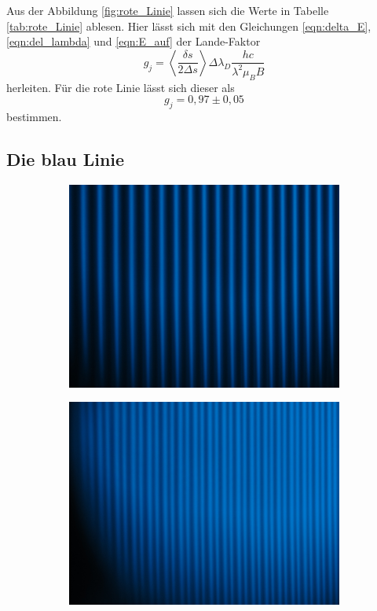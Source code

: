Aus der Abbildung \ref{fig:rote_Linie} lassen sich die Werte in Tabelle \ref{tab:rote_Linie} ablesen.
Hier lässt sich mit den Gleichungen \eqref{eqn:delta_E}, \eqref{eqn:del_lambda} und \eqref{eqn:E_auf} der Lande-Faktor
\begin{equation}
  g_j = \left<\frac{\delta s}{2\Delta s}\right>\Delta \lambda_D \frac{h c}{\lambda^2\mu_B B}
\end{equation}
herleiten.
Für die rote Linie lässt sich dieser als
\begin{equation}
  g_j = 0,97\pm 0,05
\end{equation}
bestimmen.

\subsection{Die blau Linie}
\begin{figure}
  \centering
  \begin{subfigure}{0.4\textwidth}
    \centering
    \includegraphics[width=\textwidth]{Bilder/blau_sigma_ohne_B.JPG}
  \end{subfigure}
  \begin{subfigure}{0.4\textwidth}
    \centering
    \includegraphics[width=\textwidth]{Bilder/blau_sigma_mit_B.JPG}

\end{subfigure}
\end{figure}
